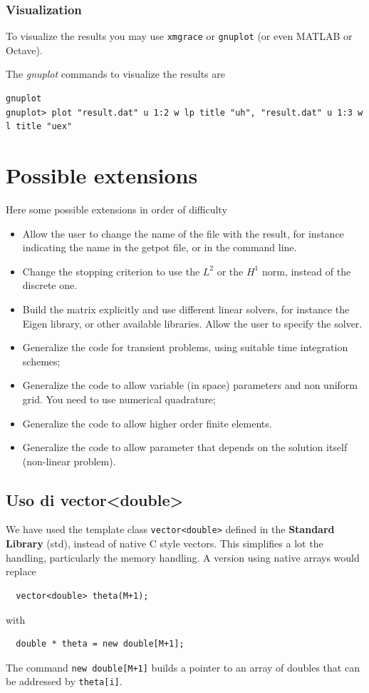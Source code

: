 \documentclass{article}
\begin{document}
\subsubsection{Visualization}
To visualize the results you may use \texttt{xmgrace} or
\texttt{gnuplot} (or even MATLAB or Octave).

The \emph{gnuplot} commands to visualize the results are 
{\small
\begin{verbatim}
gnuplot
gnuplot> plot "result.dat" u 1:2 w lp title "uh", "result.dat" u 1:3 w l title "uex"
\end{verbatim}
}
\section{Possible extensions}
Here some possible extensions in order of difficulty
\begin{itemize}
\item Allow the user to change the name of the file with the result, for instance indicating the name in the getpot file, or in the command line.
\item Change the stopping criterion to use the $L^2$ or the $H^1$ norm, instead of the discrete one.
\item Build the matrix explicitly and use different linear solvers, for instance
the Eigen library, or other available libraries. Allow the user to specify the solver.
\item Generalize the code for transient problems, using suitable time integration schemes;
\item  Generalize the code to allow variable (in space) parameters and 
non uniform grid. You need to use numerical quadrature;
\item  Generalize the code to allow higher order finite elements.
\item Generalize the code to allow parameter that depends on the solution itself (non-linear problem).
\end{itemize}

\subsection{Uso di vector<double>}
We have used the template class \texttt{vector<double>}
defined in the  \textbf{Standard Library} (std), 
instead of native C style vectors.
This simplifies a lot the handling, particularly the memory handling.
A version using native arrays would replace
\begin{verbatim}
  vector<double> theta(M+1);
\end{verbatim}
with
\begin{verbatim}
  double * theta = new double[M+1];
\end{verbatim}
The command  \texttt{new double[M+1]} builds a pointer to an array of doubles that can be addressed by \texttt{theta[i]}.
\end{document}
